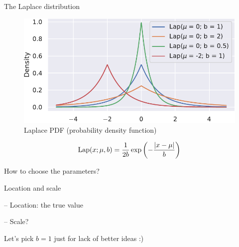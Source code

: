 \documentclass[12pt,aspectratio=169,handout]{beamer}
\begin{document}
\begin{frame}{The Laplace distribution}

\begin{figure}
\includegraphics[width=0.8\linewidth]{img/laplace-distributions.pdf}
\caption{Laplace PDF (probability density function)}
\end{figure}
$$
\textrm{Lap}(x; \mu, b) = \frac{1}{2b} \exp \left( - \frac{\abs{x - \mu}}{b}  \right)
$$

\end{frame}





\begin{frame}{How to choose the parameters?}

Location and scale

-- Location: the true value

-- Scale?

Let's pick $b = 1$ just for lack of better ideas :)

\end{frame}
\end{document}
